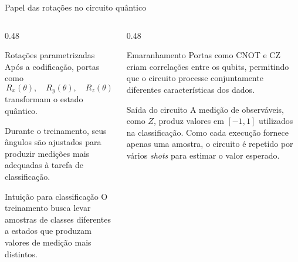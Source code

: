 \begin{frame}{Papel das rotações no circuito quântico}

\begin{columns}[T,onlytextwidth]

\begin{column}{0.48\textwidth}

\begin{block}{Rotações parametrizadas}
Após a codificação, portas como
\[
R_x(\theta),\quad R_y(\theta),\quad R_z(\theta)
\]
transformam o estado quântico.

Durante o treinamento, seus ângulos são ajustados para produzir medições
mais adequadas à tarefa de classificação.
\end{block}

\begin{alertblock}{Intuição para classificação}
O treinamento busca levar amostras de classes diferentes a estados que
produzam valores de medição mais distintos.
\end{alertblock}

\end{column}

\begin{column}{0.48\textwidth}

\begin{block}{Emaranhamento}
Portas como CNOT e CZ criam correlações entre os qubits, permitindo que o
circuito processe conjuntamente diferentes características dos dados.
\end{block}

\begin{alertblock}{Saída do circuito}
A medição de observáveis, como $Z$, produz valores em $[-1,1]$ utilizados na classificação. Como cada execução fornece apenas uma amostra, o circuito é repetido por vários \textit{shots} para estimar o valor esperado.

\end{alertblock}

\end{column}

\end{columns}

\end{frame}


